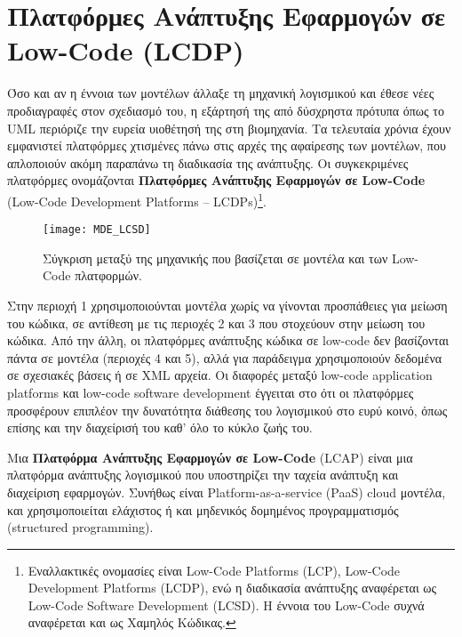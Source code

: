     \section{Πλατφόρμες Ανάπτυξης Εφαρμογών σε Low-Code (LCDP)}
        Όσο και αν η έννοια των μοντέλων άλλαξε τη μηχανική λογισμικού και έθεσε νέες προδιαγραφές στον σχεδιασμό του, η εξάρτησή της από δύσχρηστα πρότυπα όπως το UML περιόριζε την ευρεία υιοθέτησή της στη βιομηχανία. Τα τελευταία χρόνια έχουν εμφανιστεί πλατφόρμες χτισμένες πάνω στις αρχές της αφαίρεσης των μοντέλων, που απλοποιούν ακόμη παραπάνω τη διαδικασία της ανάπτυξης. Οι συγκεκριμένες πλατφόρμες ονομάζονται \textbf{Πλατφόρμες Ανάπτυξης Εφαρμογών σε Low-Code} (Low-Code Development Platforms -- LCDPs)\footnote{Εναλλακτικές ονομασίες είναι Low-Code Platforms (LCP), Low-Code Development Platforms (LCDP), ενώ η διαδικασία ανάπτυξης αναφέρεται ως Low-Code Software Development (LCSD). Η έννοια του Low-Code συχνά αναφέρεται και ως Χαμηλός Κώδικας.}.\cite{Bock2021}

        \begin{figure}[H] \noindent \centering
                \texttt{[image: MDE\_LCSD]}
                \caption{\centering Σύγκριση μεταξύ της μηχανικής που βασίζεται σε μοντέλα και των Low-Code πλατφορμών. \cite{MDELow}}
        \end{figure}

        \begin{displayquote}
            \small Στην περιοχή 1 χρησιμοποιούνται μοντέλα χωρίς να γίνονται προσπάθειες για μείωση του κώδικα, σε αντίθεση με τις περιοχές 2 και 3 που στοχεύουν στην μείωση του κώδικα. Από την άλλη, οι πλατφόρμες ανάπτυξης κώδικα σε low-code δεν βασίζονται πάντα σε μοντέλα (περιοχές 4 και 5), αλλά για παράδειγμα χρησιμοποιούν δεδομένα σε σχεσιακές βάσεις ή σε XML αρχεία. Οι διαφορές μεταξύ low-code application platforms και low-code software development έγγειται στο ότι οι πλατφόρμες προσφέρουν επιπλέον την δυνατότητα διάθεσης του λογισμικού στο ευρύ κοινό, όπως επίσης και την διαχείρισή του καθ' όλο το κύκλο ζωής του.
        \end{displayquote}

        Μια \textbf{Πλατφόρμα Ανάπτυξης Εφαρμογών σε Low-Code} (LCAP) είναι μια πλατφόρμα ανάπτυξης λογισμικού που υποστηρίζει την ταχεία ανάπτυξη και διαχείριση εφαρμογών. Συνήθως είναι Platform-as-a-service (PaaS) cloud μοντέλα, και χρησιμοποιείται ελάχιστος ή και μηδενικός δομημένος προγραμματισμός (structured \linebreak programming).

